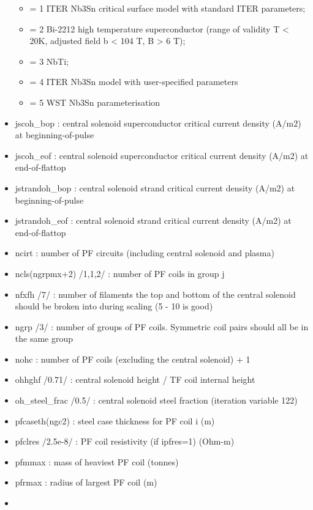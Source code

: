 \documentclass[]{article}
\providecommand{\tightlist}{%
  \setlength{\itemsep}{0pt}\setlength{\parskip}{0pt}}
\begin{document}
\begin{itemize}
  \begin{itemize}
  \tightlist
  \item
    = 1 ITER Nb3Sn critical surface model with standard ITER parameters;
  \item
    = 2 Bi-2212 high temperature superconductor (range of validity T
    \textless{} 20K, adjusted field b \textless{} 104 T, B
    \textgreater{} 6 T);
  \item
    = 3 NbTi;
  \item
    = 4 ITER Nb3Sn model with user-specified parameters
  \item
    = 5 WST Nb3Sn parameterisation
  \end{itemize}
\item
  jscoh\_bop : central solenoid superconductor critical current density
  (A/m2) at beginning-of-pulse
\item
  jscoh\_eof : central solenoid superconductor critical current density
  (A/m2) at end-of-flattop
\item
  jstrandoh\_bop : central solenoid strand critical current density
  (A/m2) at beginning-of-pulse
\item
  jstrandoh\_eof : central solenoid strand critical current density
  (A/m2) at end-of-flattop
\item
  ncirt : number of PF circuits (including central solenoid and plasma)
\item
  ncls(ngrpmx+2) /1,1,2/ : number of PF coils in group j
\item
  nfxfh /7/ : number of filaments the top and bottom of the central
  solenoid should be broken into during scaling (5 - 10 is good)
\item
  ngrp /3/ : number of groups of PF coils. Symmetric coil pairs should
  all be in the same group
\item
  nohc : number of PF coils (excluding the central solenoid) + 1
\item
  ohhghf /0.71/ : central solenoid height / TF coil internal height
\item
  oh\_steel\_frac /0.5/ : central solenoid steel fraction (iteration
  variable 122)
\item
  pfcaseth(ngc2) : steel case thickness for PF coil i (m)
\item
  pfclres /2.5e-8/ : PF coil resistivity (if ipfres=1) (Ohm-m)
\item
  pfmmax : mass of heaviest PF coil (tonnes)
\item
  pfrmax : radius of largest PF coil (m)
\item

\end{itemize}
\end{document}
